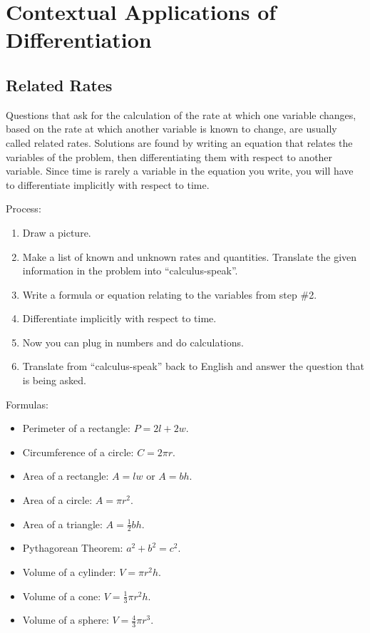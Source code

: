 \documentclass[../abcalc.tex]{subfiles}
\begin{document}
\chapter{Contextual Applications of Differentiation}
\section{Related Rates}
Questions that ask for the calculation of the rate at which one variable changes, based on the rate at which another variable is known to change,
are usually called related rates. Solutions are found by writing an equation that relates the variables of the problem, then differentiating them 
with respect to another variable. Since time is rarely a variable in the equation you write, you will have to differentiate implicitly with respect to time.

Process:
\begin{enumerate}
    \item Draw a picture.
    \item Make a list of known and unknown rates and quantities. Translate the given information in the problem into ``calculus-speak''.
    \item Write a formula or equation relating to the variables from step \#2.
    \item Differentiate implicitly with respect to time.
    \item Now you can plug in numbers and do calculations. 
    \item Translate from ``calculus-speak'' back to English and answer the question that is being asked.
\end{enumerate}

Formulas:
\begin{itemize}
    \item Perimeter of a rectangle: $P=2l+2w$.
    \item Circumference of a circle: $C=2\pi r$.
    \item Area of a rectangle: $A=lw$ or $A=bh$.
    \item Area of a circle: $A=\pi r^2$.
    \item Area of a triangle: $A=\frac{1}{2}bh$.
    \item Pythagorean Theorem: $a^2+b^2=c^2$.
    \item Volume of a cylinder: $V=\pi r^2h$.
    \item Volume of a cone: $V=\frac{1}{3}\pi r^2 h$.
    \item Volume of a sphere: $V=\frac{4}{3}\pi r^3$.
\end{itemize}
\end{document}
